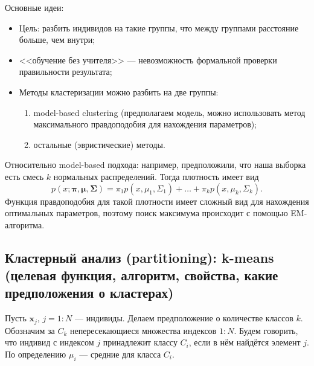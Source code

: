 \documentclass[12pt,a4paper,final]{article}
\newcommand{\1}{\mathds{1}}
\begin{document}
Основные идеи:
\begin{itemize}
\item Цель: разбить индивидов на такие группы, что между группами расстояние больше, чем внутри;
\item <<обучение без учителя>> --- невозможность формальной проверки правильности результата;
\item Методы кластеризации можно разбить на две группы:
\begin{enumerate}
\item model-based clustering (предполагаем модель, можно использовать метод максимального правдоподобия для нахождения параметров);
\item остальные (эвристические) методы.
\end{enumerate}
\end{itemize}

Относительно model-based подхода: например, предположили, что наша выборка есть смесь $k$ нормальных распределений. Тогда плотность имеет вид
$$
p(x; \bm \pi, \bm \mu, \bm \Sigma) = \pi_1 p(x, \mu_1, \Sigma_1) + \ldots + \pi_k p(x, \mu_k, \Sigma_k).
$$
Функция правдоподобия для такой плотности имеет сложный вид для нахождения оптимальных параметров, поэтому поиск максимума происходит с помощью EM-алгоритма.

\subsection{Кластерный анализ (partitioning): k-means (целевая функция, алгоритм, свойства, какие предположения о кластерах)}

Пусть $\bm x_j$, $j = 1:N$ --- индивиды. Делаем предположение о количестве классов $k$. Обозначим за $C_k$ непересекающиеся множества индексов $1:N$. Будем говорить, что индивид с индексом $j$ принадлежит классу $C_i$, если в нём найдётся элемент $j$. По определению $\mu_i$ --- средние для класса $C_i$.
\end{document}
